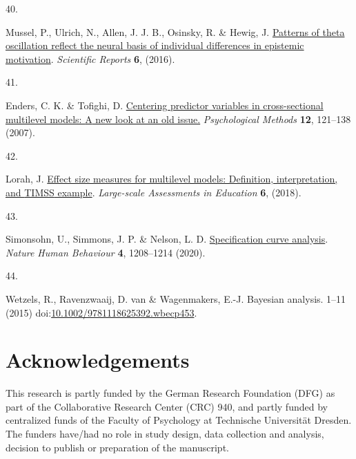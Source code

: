 \documentclass[
  man,floatsintext]{apa6}
\newlength{\cslhangindent}
\newlength{\csllabelwidth}
\newlength{\cslentryspacingunit} %
\newenvironment{CSLReferences}[2] %
 {%
  \setlength{\parindent}{0pt}
  \ifodd #1
  \let\oldpar\par
  \def\par{\hangindent=\cslhangindent\oldpar}
  \fi
  \setlength{\parskip}{#2\cslentryspacingunit}
 }%
 {}
\newcommand{\CSLLeftMargin}[1]{\parbox[t]{\csllabelwidth}{#1}}
\newcommand{\CSLRightInline}[1]{\parbox[t]{\linewidth - \csllabelwidth}{#1}\break}
\begin{document}
\begin{CSLReferences}{0}{0}
\leavevmode{}%
\CSLLeftMargin{40. }%
\CSLRightInline{Mussel, P., Ulrich, N., Allen, J. J. B., Osinsky, R. \& Hewig, J. \href{https://doi.org/10.1038/srep29245}{Patterns of theta oscillation reflect the neural basis of individual differences in epistemic motivation}. \emph{Scientific Reports} \textbf{6}, (2016).}

\leavevmode{}%
\CSLLeftMargin{41. }%
\CSLRightInline{Enders, C. K. \& Tofighi, D. \href{https://doi.org/10.1037/1082-989x.12.2.121}{Centering predictor variables in cross-sectional multilevel models: {A} new look at an old issue.} \emph{Psychological Methods} \textbf{12}, 121--138 (2007).}

\leavevmode{}%
\CSLLeftMargin{42. }%
\CSLRightInline{Lorah, J. \href{https://doi.org/10.1186/s40536-018-0061-2}{Effect size measures for multilevel models: Definition, interpretation, and {TIMSS} example}. \emph{Large-scale Assessments in Education} \textbf{6}, (2018).}

\leavevmode{}%
\CSLLeftMargin{43. }%
\CSLRightInline{Simonsohn, U., Simmons, J. P. \& Nelson, L. D. \href{https://doi.org/10.1038/s41562-020-0912-z}{Specification curve analysis}. \emph{Nature Human Behaviour} \textbf{4}, 1208--1214 (2020).}

\leavevmode{}%
\CSLLeftMargin{44. }%
\CSLRightInline{Wetzels, R., Ravenzwaaij, D. van \& Wagenmakers, E.-J. Bayesian analysis. 1--11 (2015) doi:\href{https://doi.org/10.1002/9781118625392.wbecp453}{10.1002/9781118625392.wbecp453}.}

\end{CSLReferences}

\endgroup

\newpage

\hypertarget{acknowledgements}{%
\section{Acknowledgements}\label{acknowledgements}}

This research is partly funded by the German Research Foundation (DFG) as part of the Collaborative Research Center (CRC) 940, and partly funded by centralized funds of the Faculty of Psychology at Technische Universität Dresden.
The funders have/had no role in study design, data collection and analysis, decision to publish or preparation of the manuscript.
\end{document}
